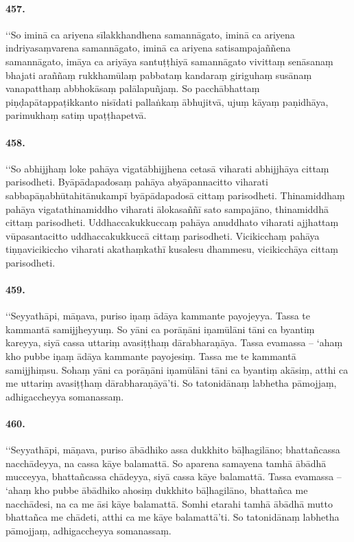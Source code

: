 \paragraph{457.} ‘‘So iminā ca ariyena sīlakkhandhena samannāgato, iminā ca ariyena indriyasaṃvarena samannāgato, iminā ca ariyena satisampajaññena samannāgato, imāya ca ariyāya santuṭṭhiyā samannāgato vivittaṃ senāsanaṃ bhajati araññaṃ rukkhamūlaṃ pabbataṃ kandaraṃ giriguhaṃ susānaṃ vanapatthaṃ abbhokāsaṃ palālapuñjaṃ. So pacchābhattaṃ piṇḍapātappaṭikkanto nisīdati pallaṅkaṃ ābhujitvā, ujuṃ kāyaṃ paṇidhāya, parimukhaṃ satiṃ upaṭṭhapetvā.

\paragraph{458.} ‘‘So abhijjhaṃ loke pahāya vigatābhijjhena cetasā viharati abhijjhāya cittaṃ parisodheti. Byāpādapadosaṃ pahāya abyāpannacitto viharati sabbapāṇabhūtahitānukampī byāpādapadosā cittaṃ parisodheti. Thinamiddhaṃ pahāya vigatathinamiddho viharati ālokasaññī sato sampajāno, thinamiddhā cittaṃ parisodheti. Uddhaccakukkuccaṃ pahāya anuddhato viharati ajjhattaṃ vūpasantacitto uddhaccakukkuccā cittaṃ parisodheti. Vicikicchaṃ pahāya tiṇṇavicikiccho viharati akathaṃkathī kusalesu dhammesu, vicikicchāya cittaṃ parisodheti.

\paragraph{459.} ‘‘Seyyathāpi, māṇava, puriso iṇaṃ ādāya kammante payojeyya. Tassa te kammantā samijjheyyuṃ. So yāni ca porāṇāni iṇamūlāni tāni ca byantiṃ kareyya, siyā cassa uttariṃ avasiṭṭhaṃ dārabharaṇāya. Tassa evamassa – ‘ahaṃ kho pubbe iṇaṃ ādāya kammante payojesiṃ. Tassa me te kammantā samijjhiṃsu. Sohaṃ yāni ca porāṇāni iṇamūlāni tāni ca byantiṃ akāsiṃ, atthi ca me uttariṃ avasiṭṭhaṃ dārabharaṇāyā’ti. So tatonidānaṃ labhetha pāmojjaṃ, adhigaccheyya somanassaṃ.

\paragraph{460.} ‘‘Seyyathāpi, māṇava, puriso ābādhiko assa dukkhito bāḷhagilāno; bhattañcassa nacchādeyya, na cassa kāye balamattā. So aparena samayena tamhā ābādhā mucceyya, bhattañcassa chādeyya, siyā cassa kāye balamattā. Tassa evamassa – ‘ahaṃ kho pubbe ābādhiko ahosiṃ dukkhito bāḷhagilāno, bhattañca me nacchādesi, na ca me āsi kāye balamattā. Somhi etarahi tamhā ābādhā mutto bhattañca me chādeti, atthi ca me kāye balamattā’ti. So tatonidānaṃ labhetha pāmojjaṃ, adhigaccheyya somanassaṃ.

